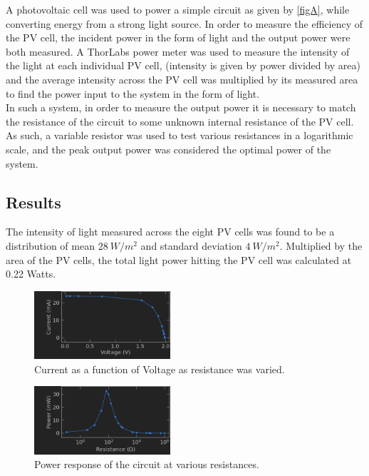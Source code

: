 \documentclass[aps,prl,reprint]{revtex4-2}
\begin{document}
A photovoltaic cell was used to power a simple circuit as given by \ref{figA},
while converting energy from a strong light source.
In order to measure the efficiency of the PV cell, the incident power in the 
form of light and the output power were both measured. 
A ThorLabs power meter was used to measure the intensity of the light at each 
individual PV cell, (intensity is given by power divided by area) and the
average intensity across the PV cell was multiplied by its measured area to 
find the power input to the system in the form of light. \\

In such a system, in order to measure the output power it is necessary to match
the resistance of the circuit to some unknown internal resistance of the PV cell. As such, a variable resistor was used to test various resistances in a 
logarithmic scale, and the peak output power was considered the optimal power
of the system.

\subsection{Results}

The intensity of light measured across the eight PV cells was found to be a
distribution of mean $28\ W/m^2$ and standard deviation $4\ W/m^2$. Multiplied 
by the area of the PV cells, the total light power hitting the PV cell was 
calculated at 0.22 Watts. \\

\begin{figure}[h]
\includegraphics[width=0.45\textwidth]{../Images/l1_a_1.png}
\caption{\label{I(V)A}Current as a function of Voltage as resistance was varied.}
\end{figure}

\begin{figure}[h]
\includegraphics[width=0.45\textwidth]{../Images/l1_a_2.png}
\caption{\label{P(R)A}Power response of the circuit at various resistances.}
\end{figure}
\end{document}

